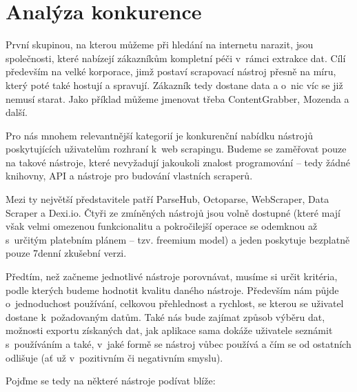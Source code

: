 \documentclass[thesis=B,czech]{FITthesis}[2012/06/26]
\begin{document}

\newpage
\section{Analýza konkurence}
První skupinou, na kterou můžeme při hledání na internetu narazit, jsou společnosti, které nabízejí zákazníkům kompletní péči v~rámci extrakce dat. Cílí především na velké korporace, jimž postaví scrapovací nástroj přesně na míru, který poté také hostují a spravují. Zákazník tedy dostane data a o~nic víc se již nemusí starat. Jako příklad můžeme jmenovat třeba ContentGrabber, Mozenda a další.

Pro nás mnohem relevantnější kategorií je konkurenční nabídku nástrojů poskytujících uživatelům rozhraní k~web scrapingu. Budeme se zaměřovat pouze na takové nástroje, které nevyžadují jakoukoli znalost programování -- tedy žádné knihovny, API a nástroje pro budování vlastních scraperů.

Mezi ty největší představitele patří ParseHub, Octoparse, WebScraper, Data Scraper a Dexi.io. Čtyři ze zmíněných nástrojů jsou volně dostupné (které mají však velmi omezenou funkcionalitu a pokročilejší operace se odemknou až s~určitým platebním plánem -- tzv. freemium model) a jeden poskytuje bezplatně pouze 7denní zkušební verzi.

Předtím, než začneme jednotlivé nástroje porovnávat, musíme si určit kritéria, podle kterých budeme hodnotit kvalitu daného nástroje. Především nám půjde o~jednoduchost používání, celkovou přehlednost a rychlost, se kterou se uživatel dostane k~požadovaným datům. Také nás bude zajímat způsob výběru dat, možnosti exportu získaných dat, jak aplikace sama dokáže uživatele seznámit s~používáním a také, v~jaké formě se nástroj vůbec používá a čím se od ostatních odlišuje (ať už v~pozitivním či negativním smyslu). 

Poj\v{d}me se tedy na některé nástroje podívat blíže:
\end{document}
